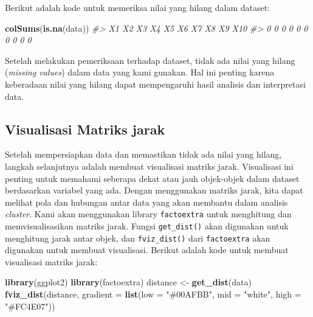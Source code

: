\documentclass[
  oneside]{book}
\newenvironment{Shaded}{\begin{snugshade}}{\end{snugshade}}
\newcommand{\AttributeTok}[1]{\textcolor[rgb]{0.13,0.29,0.53}{#1}}
\newcommand{\CommentTok}[1]{\textcolor[rgb]{0.56,0.35,0.01}{\textit{#1}}}
\newcommand{\FunctionTok}[1]{\textcolor[rgb]{0.13,0.29,0.53}{\textbf{#1}}}
\newcommand{\NormalTok}[1]{#1}
\newcommand{\OtherTok}[1]{\textcolor[rgb]{0.56,0.35,0.01}{#1}}
\newcommand{\StringTok}[1]{\textcolor[rgb]{0.31,0.60,0.02}{#1}}
\begin{document}
Berikut adalah kode untuk memeriksa nilai yang hilang dalam dataset:

\begin{Shaded}
\begin{Highlighting}[]
\FunctionTok{colSums}\NormalTok{(}\FunctionTok{is.na}\NormalTok{(data))}
\CommentTok{\#\textgreater{}  X1  X2  X3  X4  X5  X6  X7  X8  X9 X10 }
\CommentTok{\#\textgreater{}   0   0   0   0   0   0   0   0   0   0}
\end{Highlighting}
\end{Shaded}

Setelah melakukan pemeriksaan terhadap dataset, tidak ada nilai yang hilang (\emph{missing values}) dalam data yang kami gunakan. Hal ini penting karena keberadaan nilai yang hilang dapat mempengaruhi hasil analisis dan interpretasi data.

\subsection*{Visualisasi Matriks jarak}\label{visualisasi-matriks-jarak}

Setelah mempersiapkan data dan memastikan tidak ada nilai yang hilang, langkah selanjutnya adalah membuat visualisasi matriks jarak. Visualisasi ini penting untuk memahami seberapa dekat atau jauh objek-objek dalam dataset berdasarkan variabel yang ada. Dengan menggunakan matriks jarak, kita dapat melihat pola dan hubungan antar data yang akan membantu dalam analisis \emph{cluster}. Kami akan menggunakan library \texttt{factoextra} untuk menghitung dan memvisualisasikan matriks jarak. Fungsi \texttt{get\_dist()} akan digunakan untuk menghitung jarak antar objek, dan \texttt{fviz\_dist()} dari \texttt{factoextra} akan digunakan untuk membuat visualisasi. Berikut adalah kode untuk membuat visualisasi matriks jarak:

\begin{Shaded}
\begin{Highlighting}[]
\FunctionTok{library}\NormalTok{(ggplot2)}
\FunctionTok{library}\NormalTok{(factoextra)}
\NormalTok{distance }\OtherTok{\textless{}{-}} \FunctionTok{get\_dist}\NormalTok{(data)}
\FunctionTok{fviz\_dist}\NormalTok{(distance, }\AttributeTok{gradient =} \FunctionTok{list}\NormalTok{(}\AttributeTok{low =} \StringTok{"\#00AFBB"}\NormalTok{, }\AttributeTok{mid =} \StringTok{"white"}\NormalTok{, }\AttributeTok{high =} \StringTok{"\#FC4E07"}\NormalTok{))}
\end{Highlighting}
\end{Shaded}
\end{document}
